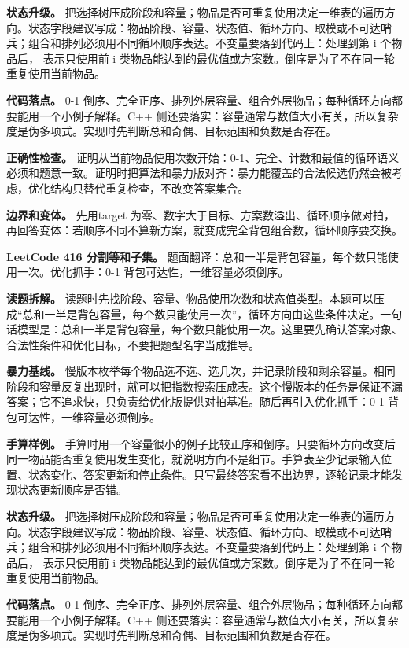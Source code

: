 \textbf{状态升级。} 把选择树压成阶段和容量；物品是否可重复使用决定一维表的遍历方向。状态字段建议写成：物品阶段、容量、状态值、循环方向、取模或不可达哨兵；组合和排列必须用不同循环顺序表达。不变量要落到代码上：处理到第 i 个物品后， 表示只使用前 i 类物品能达到的最优值或方案数。倒序是为了不在同一轮重复使用当前物品。

\textbf{代码落点。} 0-1 倒序、完全正序、排列外层容量、组合外层物品；每种循环方向都要能用一个小例子解释。C++ 侧还要落实：容量通常与数值大小有关，所以复杂度是伪多项式。实现时先判断总和奇偶、目标范围和负数是否存在。

\textbf{正确性检查。} 证明从当前物品使用次数开始：0-1、完全、计数和最值的循环语义必须和题意一致。证明时把算法和暴力版对齐：暴力能覆盖的合法候选仍然会被考虑，优化结构只替代重复检查，不改变答案集合。

\textbf{边界和变体。} 先用target 为零、数字大于目标、方案数溢出、循环顺序做对拍，再回答变体：若顺序不同不算新方案，就变成完全背包组合数，循环顺序要交换。

\noindent\textbf{LeetCode 416 分割等和子集。} 题面翻译：总和一半是背包容量，每个数只能使用一次。优化抓手：0-1 背包可达性，一维容量必须倒序。

\textbf{读题拆解。} 读题时先找阶段、容量、物品使用次数和状态值类型。本题可以压成“总和一半是背包容量，每个数只能使用一次”，循环方向由这些条件决定。一句话模型是：总和一半是背包容量，每个数只能使用一次。这里要先确认答案对象、合法性条件和优化目标，不要把题型名字当成推导。

\textbf{暴力基线。} 慢版本枚举每个物品选不选、选几次，并记录阶段和剩余容量。相同阶段和容量反复出现时，就可以把指数搜索压成表。这个慢版本的任务是保证不漏答案；它不追求快，只负责给优化版提供对拍基准。随后再引入优化抓手：0-1 背包可达性，一维容量必须倒序。

\textbf{手算样例。} 手算时用一个容量很小的例子比较正序和倒序。只要循环方向改变后同一物品能否重复使用发生变化，就说明方向不是细节。手算表至少记录输入位置、状态变化、答案更新和停止条件。只写最终答案看不出边界，逐轮记录才能发现状态更新顺序是否错。

\textbf{状态升级。} 把选择树压成阶段和容量；物品是否可重复使用决定一维表的遍历方向。状态字段建议写成：物品阶段、容量、状态值、循环方向、取模或不可达哨兵；组合和排列必须用不同循环顺序表达。不变量要落到代码上：处理到第 i 个物品后， 表示只使用前 i 类物品能达到的最优值或方案数。倒序是为了不在同一轮重复使用当前物品。

\textbf{代码落点。} 0-1 倒序、完全正序、排列外层容量、组合外层物品；每种循环方向都要能用一个小例子解释。C++ 侧还要落实：容量通常与数值大小有关，所以复杂度是伪多项式。实现时先判断总和奇偶、目标范围和负数是否存在。

